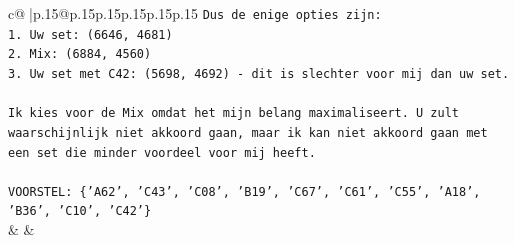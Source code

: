 \documentclass{article}
\begin{document}
{\begin{supertabular}{c@{$\;$}|p{.15\linewidth}@{}p{.15\linewidth}p{.15\linewidth}p{.15\linewidth}p{.15\linewidth}p{.15\linewidth}}
{{{\texttt{Dus de enige opties zijn:} \\
\texttt{1. Uw set: (6646, 4681)} \\
\texttt{2. Mix: (6884, 4560)} \\
\texttt{3. Uw set met C42: (5698, 4692) {-} dit is slechter voor mij dan uw set.} \\
\\ 
\texttt{Ik kies voor de Mix omdat het mijn belang maximaliseert. U zult waarschijnlijk niet akkoord gaan, maar ik kan niet akkoord gaan met een set die minder voordeel voor mij heeft.} \\
\\ 
\texttt{VOORSTEL: \{'A62', 'C43', 'C08', 'B19', 'C67', 'C61', 'C55', 'A18', 'B36', 'C10', 'C42'\}} \\
            }
        }
    }
    & & \\ \\


\end{supertabular}}
\end{document}
